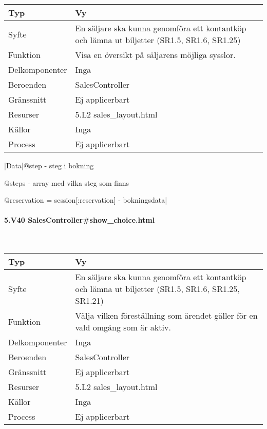 \documentclass[a4paper, twoside, 11pt, titlepage]{article}
\begin{document}
			\begin {table} [ht] \begin{tabular} {  p{3.5cm} p{9.6cm} }
				\hline
				Typ & Vy  \\
				\hline
				Syfte & En säljare ska kunna genomföra ett kontantköp och lämna ut biljetter (SR1.5, SR1.6, SR1.25)  \\
				\hline
				Funktion & Visa en översikt på säljarens möjliga sysslor.  \\
				\hline
				Delkomponenter & Inga  \\
				\hline
				Beroenden & SalesController  \\
				\hline
				Gränssnitt & Ej applicerbart  \\
				\hline
				Resurser & 5.L2 sales\_layout.html  \\
				\hline
				Källor & Inga  \\
				\hline
				Process & Ej applicerbart  \\
				\hline
			\end{tabular} \end{table} \FloatBarrier
			\vspace{6mm}

			|Data|@step - steg i bokning

			@steps - array med vilka steg som finns

			@reservation = session[:reservation] - bokningsdata|

			\paragraph{5.V40 SalesController\#show\_choice.html}\

			\begin {table} [ht] \begin{tabular} {  p{3.5cm} p{9.6cm} }
				\hline
				Typ & Vy  \\
				\hline
				Syfte & En säljare ska kunna genomföra ett kontantköp och lämna ut biljetter (SR1.5, SR1.6, SR1.25, SR1.21)  \\
				\hline
				Funktion & Välja vilken föreställning som ärendet gäller för en vald omgång som är aktiv.  \\
				\hline
				Delkomponenter & Inga  \\
				\hline
				Beroenden & SalesController  \\
				\hline
				Gränssnitt & Ej applicerbart  \\
				\hline
				Resurser & 5.L2 sales\_layout.html  \\
				\hline
				Källor & Inga  \\
				\hline
				Process & Ej applicerbart  \\
				\hline
			\end{tabular} \end{table} \FloatBarrier
			\vspace{6mm}
\end{document}
